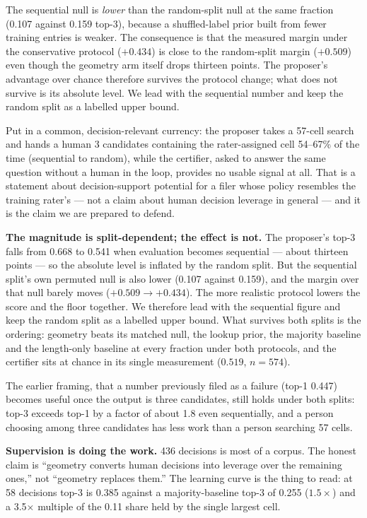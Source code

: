 \documentclass[11pt]{article}
\begin{document}
The sequential null is \emph{lower} than the random-split null at the same
fraction (0.107 against 0.159 top-3), because a shuffled-label prior built
from fewer training entries is weaker. The consequence is that the measured
margin under the conservative protocol ($+0.434$) is close to the
random-split margin ($+0.509$) even though the geometry arm itself drops
thirteen points. The proposer's advantage over chance therefore survives the
protocol change; what does not survive is its absolute level. We lead with
the sequential number and keep the random split as a labelled upper bound.

Put in a common, decision-relevant currency: the proposer takes a 57-cell
search and hands a human 3 candidates containing the rater-assigned cell
54--67\% of the time (sequential to random), while the certifier, asked to answer the
same question without a human in the loop, provides no usable signal at
all. That is a statement about decision-support potential for a filer whose
policy resembles the training rater's --- not a claim about human decision
leverage in general --- and it is the claim we are prepared to defend.

\textbf{The magnitude is split-dependent; the effect is not.} The proposer's
top-3 falls from 0.668 to 0.541 when evaluation becomes sequential --- about
thirteen points --- so the absolute level is inflated by the random split.
But the sequential split's own permuted null is also lower (0.107 against
0.159), and the margin over that null barely moves ($+0.509 \to +0.434$).
The more realistic protocol lowers the score and the floor together. We
therefore lead with the sequential figure and keep the random split as a
labelled upper bound. What survives both splits is the ordering: geometry
beats its matched null, the lookup prior, the majority baseline and the
length-only baseline at every fraction under both protocols, and the
certifier sits at chance in its single measurement ($0.519$, $n=574$).

The earlier framing, that a number previously filed as a failure (top-1
0.447) becomes useful once the output is three candidates, still holds under
both splits: top-3 exceeds top-1 by a factor of about 1.8 even sequentially,
and a person choosing among three candidates has less work than a person
searching 57 cells.

\textbf{Supervision is doing the work.} 436 decisions is most of a corpus.
The honest claim is ``geometry converts human decisions into leverage over
the remaining ones,'' not ``geometry replaces them.'' The learning curve
is the thing to read: at 58 decisions top-3 is 0.385 against a majority-baseline
top-3 of 0.255 ($1.5\times$) and a 3.5$\times$ multiple of the 0.11 share held
by the single largest cell.
\end{document}
